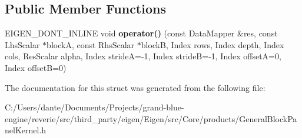 \subsection*{Public Member Functions}
\begin{DoxyCompactItemize}
\item 
\mbox{\label{struct_eigen_1_1internal_1_1gebp__kernel_afd8f51fe544ebb1106bbae9698f8a1de}} 
E\+I\+G\+E\+N\+\_\+\+D\+O\+N\+T\+\_\+\+I\+N\+L\+I\+NE void {\bfseries operator()} (const Data\+Mapper \&res, const Lhs\+Scalar $\ast$blockA, const Rhs\+Scalar $\ast$blockB, Index rows, Index depth, Index cols, Res\+Scalar alpha, Index strideA=-\/1, Index strideB=-\/1, Index offsetA=0, Index offsetB=0)
\end{DoxyCompactItemize}


The documentation for this struct was generated from the following file\+:\begin{DoxyCompactItemize}
\item 
C\+:/\+Users/dante/\+Documents/\+Projects/grand-\/blue-\/engine/reverie/src/third\+\_\+party/eigen/\+Eigen/src/\+Core/products/General\+Block\+Panel\+Kernel.\+h\end{DoxyCompactItemize}
